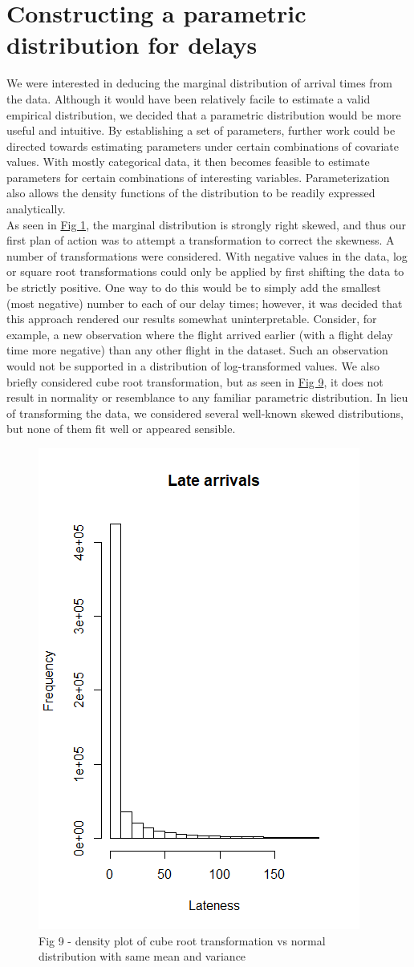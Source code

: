 \documentclass[12pt, a4paper]{book}
\newcommand\tab[1][1cm]{\hspace*{#1}}
\begin{document}
	\section{Constructing a parametric distribution for delays}
	 \tab We were interested in deducing the marginal distribution of arrival times from the data. Although it would have been relatively facile to estimate a valid empirical distribution, we decided that a parametric distribution would be more useful and intuitive. By establishing a set of parameters, further work could be directed towards estimating parameters under certain combinations of covariate values. With mostly categorical data, it then becomes feasible to estimate parameters for certain combinations of interesting variables. Parameterization also allows the density functions of the distribution to be readily expressed analytically.\\
	\tab As seen in \underline{Fig 1}, the marginal distribution is strongly right skewed, and thus our first plan of action was to attempt a transformation to correct the skewness. A number of transformations were considered. With negative values in the data, log or square root transformations could only be applied by first shifting the data to be strictly positive. One way to do this would be to simply add the smallest (most negative) number to each of our delay times; however, it was decided that this approach rendered our results somewhat uninterpretable. Consider, for example, a new observation where the flight arrived earlier (with a flight delay time more negative) than any other flight in the dataset. Such an observation would not be supported in a distribution of log-transformed values. We also briefly considered cube root transformation, but as seen in \underline{Fig 9}, it does not result in normality or resemblance to any familiar parametric distribution. In lieu of transforming the data, we considered several well-known skewed distributions, but none of them fit well or appeared sensible.
			\begin{figure}
			\centering
	 		\includegraphics[width = .35 \textwidth]{../figures/LateArrivalsHistogram}
	 		\caption{Fig 9 - density plot of cube root transformation vs normal distribution with same mean and variance}
	 		\end{figure}
\end{document}
